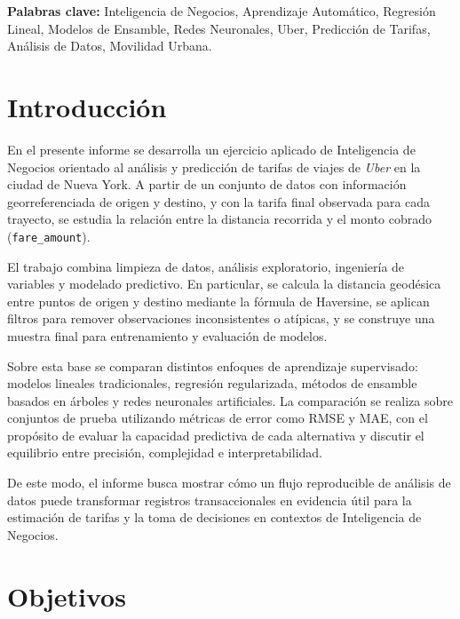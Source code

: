 \documentclass[10pt]{article}
\begin{document}
	\vspace{0.3cm}
	\noindent\textbf{Palabras clave:} Inteligencia de Negocios, Aprendizaje Automático, Regresión Lineal, Modelos de Ensamble, Redes Neuronales, Uber, Predicción de Tarifas, Análisis de Datos, Movilidad Urbana.

		\vspace{1cm}


	\section{Introducción}

	En el presente informe se desarrolla un ejercicio aplicado de Inteligencia de Negocios orientado al análisis y predicción de tarifas de viajes de \textit{Uber} en la ciudad de Nueva York. A partir de un conjunto de datos con información georreferenciada de origen y destino, y con la tarifa final observada para cada trayecto, se estudia la relación entre la distancia recorrida y el monto cobrado (\texttt{fare\_amount}).

	El trabajo combina limpieza de datos, análisis exploratorio, ingeniería de variables y modelado predictivo. En particular, se calcula la distancia geodésica entre puntos de origen y destino mediante la fórmula de Haversine, se aplican filtros para remover observaciones inconsistentes o atípicas, y se construye una muestra final para entrenamiento y evaluación de modelos.

	Sobre esta base se comparan distintos enfoques de aprendizaje supervisado: modelos lineales tradicionales, regresión regularizada, métodos de ensamble basados en árboles y redes neuronales artificiales. La comparación se realiza sobre conjuntos de prueba utilizando métricas de error como RMSE y MAE, con el propósito de evaluar la capacidad predictiva de cada alternativa y discutir el equilibrio entre precisión, complejidad e interpretabilidad.

	De este modo, el informe busca mostrar cómo un flujo reproducible de análisis de datos puede transformar registros transaccionales en evidencia útil para la estimación de tarifas y la toma de decisiones en contextos de Inteligencia de Negocios.

	\section{Objetivos}
\end{document}
